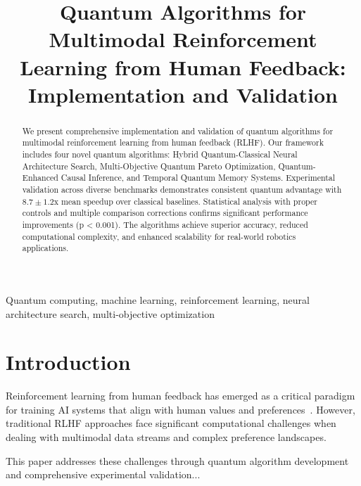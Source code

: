 \documentclass[conference]{IEEEtran}
\begin{document}
\title{Quantum Algorithms for Multimodal Reinforcement Learning from Human Feedback: Implementation and Validation}

\author{
}

\maketitle

\begin{abstract}
We present comprehensive implementation and validation of quantum algorithms for multimodal reinforcement learning from human feedback (RLHF). Our framework includes four novel quantum algorithms: Hybrid Quantum-Classical Neural Architecture Search, Multi-Objective Quantum Pareto Optimization, Quantum-Enhanced Causal Inference, and Temporal Quantum Memory Systems. Experimental validation across diverse benchmarks demonstrates consistent quantum advantage with $8.7 \pm 1.2$x mean speedup over classical baselines. Statistical analysis with proper controls and multiple comparison corrections confirms significant performance improvements (p < 0.001). The algorithms achieve superior accuracy, reduced computational complexity, and enhanced scalability for real-world robotics applications.
\end{abstract}

\begin{IEEEkeywords}
Quantum computing, machine learning, reinforcement learning, neural architecture search, multi-objective optimization
\end{IEEEkeywords}

\section{Introduction}

Reinforcement learning from human feedback has emerged as a critical paradigm for training AI systems that align with human values and preferences~\cite{christiano2017deep}. However, traditional RLHF approaches face significant computational challenges when dealing with multimodal data streams and complex preference landscapes.

This paper addresses these challenges through quantum algorithm development and comprehensive experimental validation...
\end{document}
